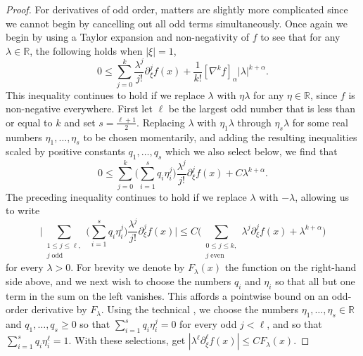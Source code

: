 \documentclass[oneside,hidelinks,indentfirst,10pt]{book}
\begin{document}
\begin{proof}
For derivatives of odd order, matters are slightly more complicated since we cannot begin by cancelling out all odd terms simultaneously. Once again we begin by using a Taylor expansion and non-negativity of \(f\) to see that for any \(\lambda\in\mathbb{R}\), the following holds when \(|\xi|=1\),
\[
    0\leq \sum_{j=0}^k\frac{\lambda^j}{j!}\partial^j_\xi f(x)+\frac{1}{k!}[\nabla^kf]_\alpha|\lambda|^{k+\alpha}.
\]
This inequality continues to hold if we replace \(\lambda\) with \(\eta\lambda\) for any \(\eta\in\mathbb{R}\), since \(f\) is non-negative everywhere. First let \(\ell\) be the largest odd number that is less than or equal to \(k\) and set \(s=\frac{\ell+1}{2}\). Replacing  \(\lambda\) with \(\eta_1\lambda\) through \(\eta_s\lambda\) for some real numbers \(\eta_1,\dots,\eta_s\) to be chosen momentarily, and adding the resulting inequalities scaled by positive constants \(q_1,\dots,q_s\) which we also select below, we find that
\[
    0\leq \sum_{j=0}^k\bigg(\sum_{i=1}^sq_i\eta_i^j\bigg)\frac{\lambda^j}{j!}\partial^j_\xi f(x)+C\lambda^{k+\alpha}.
\]
The preceding inequality continues to hold if we replace \(\lambda\) with \(-\lambda\), allowing us to write
\[
    \bigg|\sum_{\substack{1\leq j\leq \ell,\\ j\;\textrm{odd}}}\bigg(\sum_{i=1}^sq_i\eta_i^j\bigg)\frac{\lambda^j}{j!}\partial^j_\xi f(x)\bigg|\leq C\bigg(\sum_{\substack{0\leq j\leq k,\\ j\;\textrm{even}}}\lambda^j\partial^j_\xi f(x)+\lambda^{k+\alpha}\bigg)
\]
for every \(\lambda>0\). For brevity we denote by \(F_\lambda(x)\) the function on the right-hand side above, and we next wish to choose the numbers \(q_i\) and \(\eta_i\) so that all but one term in the sum on the left vanishes. This affords a pointwise bound on an odd-order derivative by \(F_\lambda\). Using the technical , we choose the numbers \(\eta_1,\dots,\eta_s\in\mathbb{R}\) and \(q_1,\dots,q_s\geq 0\) so that \(\sum_{i=1}^sq_i\eta_i^j=0\) for every odd \(j<\ell\), and so that \(\sum_{i=1}^sq_i\eta_i^\ell=1\). With these selections, get \(|\lambda^\ell\partial^\ell_\xi f(x)|\leq C F_\lambda(x)\).



\end{proof}
\end{document}
